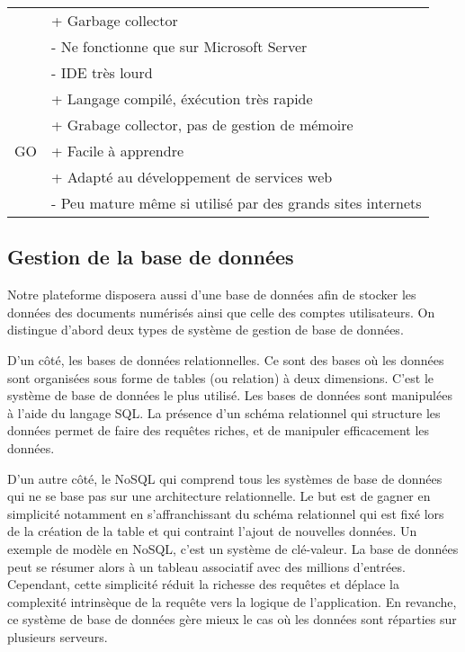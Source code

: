 \begin{tabular}{|l|l|}
                & + Garbage collector \\
                & - Ne fonctionne que sur Microsoft Server \\
                & - IDE très lourd \\ \hline
            \multirow{5}{*}{GO} & + Langage compilé, éxécution  très rapide \\
                & + Grabage collector, pas de gestion de mémoire \\
                & + Facile à apprendre \\
                & + Adapté au développement de services web \\
                & - Peu mature même si utilisé par des grands sites internets \\
            \hline
        \end{tabular}

    \subsection{Gestion de la base de données}
    \label{subsec:bdd}

   Notre plateforme disposera aussi d’une base de données afin de stocker les données des documents numérisés ainsi
   que celle des comptes utilisateurs. On distingue d’abord deux types de système de gestion de base de données.

   D’un côté, les bases de données relationnelles. Ce sont des bases où les données sont organisées sous forme
   de tables (ou relation) à deux dimensions. C’est le système de base de données le plus utilisé. Les bases
   de données sont manipulées à l’aide du langage SQL. La présence d’un schéma relationnel qui structure les données
   permet de faire des requêtes riches, et de manipuler efficacement les données.

   D’un autre côté, le NoSQL qui comprend tous les systèmes de base de données qui ne se base pas sur
   une architecture relationnelle. Le but est de gagner en simplicité notamment en s’affranchissant
   du schéma relationnel qui est fixé lors de la création de la table et qui contraint l’ajout de nouvelles données.
   Un exemple de modèle en NoSQL, c’est un système de clé-valeur. La base de données peut se résumer alors
   à un tableau associatif avec des millions d’entrées. Cependant, cette simplicité réduit la richesse des requêtes
   et déplace la complexité intrinsèque de la requête vers la logique de l’application. En revanche, ce système de base
   de données gère mieux le cas où les données sont réparties sur plusieurs serveurs.


